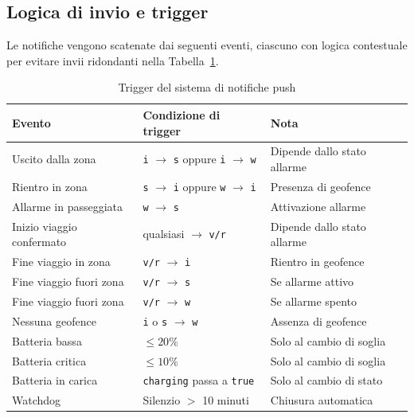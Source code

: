\documentclass[12pt,a4paper]{article}
\begin{document}
\subsection{Logica di invio e trigger}
Le notifiche vengono scatenate dai seguenti eventi, 
ciascuno con logica contestuale per evitare invii ridondanti nella Tabella~\ref{tab:notifiche}.

\begin{table}[H]
\centering
\begin{tabular}{@{}lp{4.5cm}p{5cm}@{}}
\toprule
\textbf{Evento} & \textbf{Condizione di trigger} & \textbf{Nota} \\
\midrule
Uscito dalla zona                 & \texttt{i} $\to$ \texttt{s} oppure \texttt{i} $\to$ \texttt{w} & Dipende dallo stato allarme               \\
Rientro in zona                   & \texttt{s} $\to$ \texttt{i} oppure \texttt{w} $\to$ \texttt{i} & Presenza di geofence                      \\
Allarme in passeggiata            & \texttt{w} $\to$ \texttt{s}                                    & Attivazione allarme                       \\
Inizio viaggio confermato         & qualsiasi $\to$ \texttt{v/r}                                   & Dipende dallo stato allarme               \\
Fine viaggio in zona              & \texttt{v/r} $\to$ \texttt{i}                                  & Rientro in geofence                       \\
Fine viaggio fuori zona           & \texttt{v/r} $\to$ \texttt{s}                                  & Se allarme attivo                         \\
Fine viaggio fuori zona           & \texttt{v/r} $\to$ \texttt{w}                                  & Se allarme spento                         \\
Nessuna geofence                  & \texttt{i} o \texttt{s} $\to$ \texttt{w}                       & Assenza di geofence                       \\
Batteria bassa                    & $\leq 20\%$                                                    & Solo al cambio di soglia                  \\
Batteria critica                  & $\leq 10\%$                                                    & Solo al cambio di soglia                  \\
Batteria in carica                & \texttt{charging} passa a \texttt{true}                        & Solo al cambio di stato                   \\
Watchdog                          & Silenzio $>$ 10 minuti                                         & Chiusura automatica                       \\
\bottomrule
\end{tabular}
\caption{Trigger del sistema di notifiche push}
\label{tab:notifiche}
\end{table}
\end{document}
